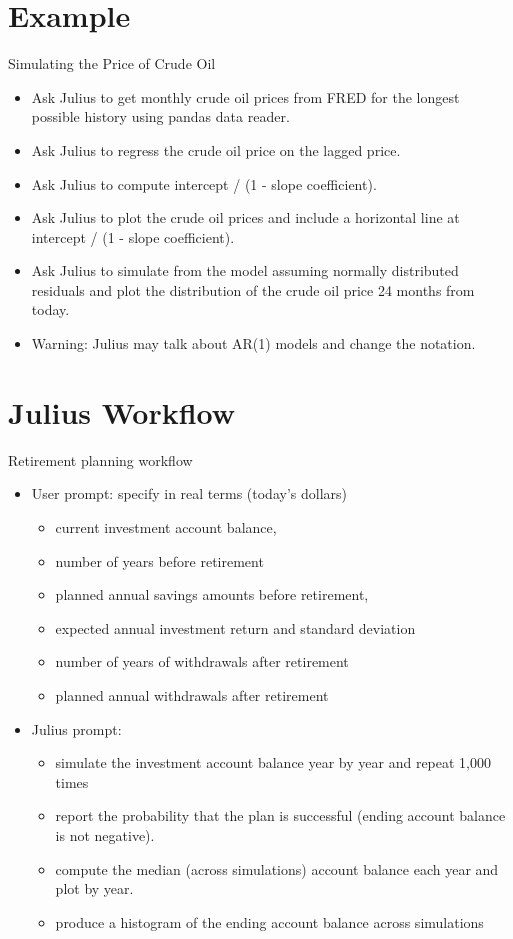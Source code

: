 \documentclass[10pt]{beamer}
\begin{document}
\section{Example}

\begin{frame}{Simulating the Price of Crude Oil}
\begin{itemize}
\item Ask Julius to get monthly crude oil prices from FRED for the longest possible history using pandas data reader.
\item Ask Julius to regress the crude oil price on the lagged price.
\item Ask Julius to compute intercept / (1 - slope coefficient).
\item Ask Julius to plot the crude oil prices and include a horizontal line at intercept / (1 - slope coefficient).
\item Ask Julius to simulate from the model assuming normally distributed residuals and plot the distribution of the crude oil price 24 months from today.
\item Warning: Julius may talk about AR(1) models and change the notation.
\end{itemize}
\end{frame}

\section{Julius Workflow}

\begin{frame}{Retirement planning workflow}
\begin{itemize}
\item User prompt: specify in real terms (today's dollars)
\begin{itemize}
\item  current investment account balance, 
\item number of years before retirement
\item planned annual savings amounts before retirement, 
\item expected annual investment return and standard deviation 
\item number of years of withdrawals after retirement
\item planned annual withdrawals after retirement
\end{itemize}
\item Julius prompt:
\begin{itemize}
\item simulate the investment account balance year by year and repeat 1,000 times
\item report the probability that the plan is successful (ending account balance is not negative).
\item compute the median (across simulations) account balance each year and plot by year.
\item produce a histogram of the ending account balance across simulations 
\end{itemize}
\end{itemize}
\end{frame}
\end{document}
